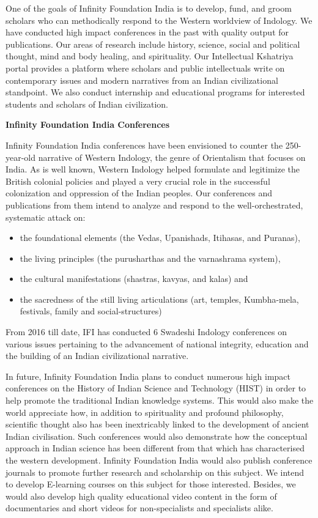 \vspace{-.3cm}

One of the goals of Infinity Foundation India is to develop, fund, and groom scholars who can methodically respond to the Western worldview of Indology. We have conducted high impact conferences in the past with quality output for publications. Our areas of research include history, science, social and political thought, mind and body healing, and spirituality. Our Intellectual Kshatriya portal provides a platform where scholars and public intellectuals write on contemporary issues and modern narratives from an Indian civilizational standpoint. We also conduct internship and educational programs for interested students and scholars of Indian civilization.

\textbf{Infinity Foundation India Conferences}


Infinity Foundation India conferences have been envisioned to counter the 250-year-old narrative of Western Indology, the genre of Orientalism that focuses on India. As is well known, Western Indology helped formulate and legitimize the British colonial policies and played a very crucial role in the successful colonization and oppression of the Indian peoples. Our conferences and publications from them intend to analyze and respond to the well-orchestrated, systematic attack on:
\begin{itemize}
\itemsep=0pt
\item the foundational elements (the Vedas, Upanishads, Itihasas, and Puranas),

\item the living principles (the purusharthas and the varnashrama system),

\item the cultural manifestations (shastras, kavyas, and kalas) and

\item the sacredness of the still living articulations (art, temples, Kumbha-mela, festivals, family and social-structures)
\end{itemize}

From 2016 till date, IFI has conducted 6 Swadeshi Indology conferences on various issues pertaining to the advancement of national integrity, education and the building of an Indian civilizational narrative.

In future, Infinity Foundation India plans to conduct numerous high impact conferences on the History of Indian Science and Technology (HIST) in order to help promote the traditional Indian knowledge systems. This would also make the world appreciate how, in addition to spirituality and profound philosophy, scientific thought also has been inextricably linked to the development of ancient Indian civilisation. Such conferences would also demonstrate how the conceptual approach in Indian science has been different from that which has characterised the western development. Infinity Foundation India would also publish conference journals to promote further research and scholarship on this subject. We intend to develop E-learning courses on this subject for those interested. Besides, we would also develop high quality educational video content in the form of documentaries and short videos for non-specialists and specialists alike.

\label{endpreface4}
